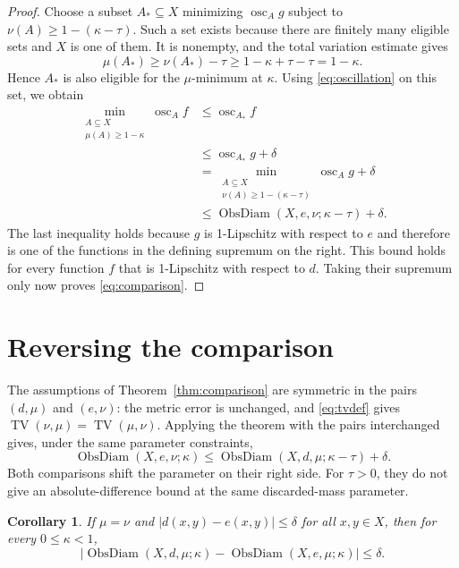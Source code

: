 \documentclass[a4paper,11pt]{article}
\newtheorem{corollary}[theorem]{Corollary}
\DeclareMathOperator{\ObsDiam}{ObsDiam}
\DeclareMathOperator{\osc}{osc}
\DeclareMathOperator{\TV}{TV}
\begin{document}
\begin{proof}
Choose a subset $A_*\subseteq X$ minimizing $\osc_A g$ subject to
$\nu(A)\ge1-(\kappa-\tau)$. Such a set exists because there are
finitely many eligible sets and $X$ is one of them. It is nonempty,
and the total variation estimate gives
\[
 \mu(A_*)\ge\nu(A_*)-\tau
 \ge1-\kappa+\tau-\tau=1-\kappa.
\]
Hence $A_*$ is also eligible for the $\mu$-minimum at $\kappa$.
Using \eqref{eq:oscillation} on this set, we obtain
\begin{align*}
 \min_{\substack{A\subseteq X\\\mu(A)\ge1-\kappa}}\osc_A f
 &\le\osc_{A_*}f\\
 &\le\osc_{A_*}g+\delta\\
 &=\min_{\substack{A\subseteq X\\\nu(A)\ge1-(\kappa-\tau)}}
       \osc_A g+\delta\\
 &\le\ObsDiam(X,e,\nu;\kappa-\tau)+\delta.
\end{align*}
The last inequality holds because $g$ is 1-Lipschitz with respect to $e$ and therefore
is one of the functions in the defining supremum on the right.
This bound holds for every function $f$ that is 1-Lipschitz with respect to $d$. Taking their
supremum only now proves \eqref{eq:comparison}.
\end{proof}

\section{Reversing the comparison}

The assumptions of Theorem~\ref{thm:comparison} are symmetric in the
pairs $(d,\mu)$ and $(e,\nu)$: the metric error is unchanged, and
\eqref{eq:tvdef} gives $\TV(\nu,\mu)=\TV(\mu,\nu)$. Applying the
theorem with the pairs interchanged gives, under the same parameter
constraints,
\begin{equation}\label{eq:reverse}
 \ObsDiam(X,e,\nu;\kappa)
 \le\ObsDiam(X,d,\mu;\kappa-\tau)+\delta.
\end{equation}
Both comparisons shift the parameter on their right side. For
$\tau>0$, they do not give an absolute-difference bound at the same
discarded-mass parameter.

\begin{corollary}\label{cor:metric}
If $\mu=\nu$ and $|d(x,y)-e(x,y)|\le\delta$ for all $x,y\in X$, then
for every $0\le\kappa<1$,
\[
 \bigl|\ObsDiam(X,d,\mu;\kappa)
       -\ObsDiam(X,e,\mu;\kappa)\bigr|\le\delta.
\]
\end{corollary}
\end{document}
